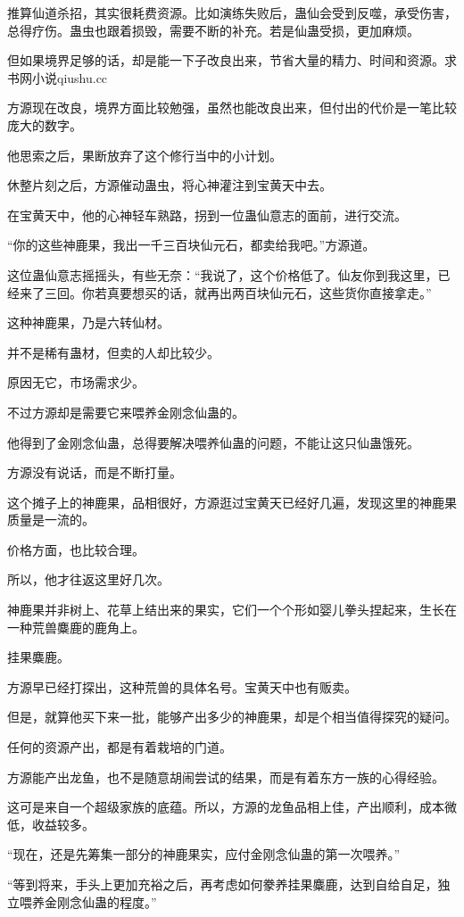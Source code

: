 \begin{this_body}
推算仙道杀招，其实很耗费资源。比如演练失败后，蛊仙会受到反噬，承受伤害，总得疗伤。蛊虫也跟着损毁，需要不断的补充。若是仙蛊受损，更加麻烦。

但如果境界足够的话，却是能一下子改良出来，节省大量的精力、时间和资源。求书网小说qiushu.cc

方源现在改良，境界方面比较勉强，虽然也能改良出来，但付出的代价是一笔比较庞大的数字。

他思索之后，果断放弃了这个修行当中的小计划。

休整片刻之后，方源催动蛊虫，将心神灌注到宝黄天中去。

在宝黄天中，他的心神轻车熟路，拐到一位蛊仙意志的面前，进行交流。

“你的这些神鹿果，我出一千三百块仙元石，都卖给我吧。”方源道。

这位蛊仙意志摇摇头，有些无奈：“我说了，这个价格低了。仙友你到我这里，已经来了三回。你若真要想买的话，就再出两百块仙元石，这些货你直接拿走。”

这种神鹿果，乃是六转仙材。

并不是稀有蛊材，但卖的人却比较少。

原因无它，市场需求少。

不过方源却是需要它来喂养金刚念仙蛊的。

他得到了金刚念仙蛊，总得要解决喂养仙蛊的问题，不能让这只仙蛊饿死。

方源没有说话，而是不断打量。

这个摊子上的神鹿果，品相很好，方源逛过宝黄天已经好几遍，发现这里的神鹿果质量是一流的。

价格方面，也比较合理。

所以，他才往返这里好几次。

神鹿果并非树上、花草上结出来的果实，它们一个个形如婴儿拳头捏起来，生长在一种荒兽麋鹿的鹿角上。

挂果麋鹿。

方源早已经打探出，这种荒兽的具体名号。宝黄天中也有贩卖。

但是，就算他买下来一批，能够产出多少的神鹿果，却是个相当值得探究的疑问。

任何的资源产出，都是有着栽培的门道。

方源能产出龙鱼，也不是随意胡闹尝试的结果，而是有着东方一族的心得经验。

这可是来自一个超级家族的底蕴。所以，方源的龙鱼品相上佳，产出顺利，成本微低，收益较多。

“现在，还是先筹集一部分的神鹿果实，应付金刚念仙蛊的第一次喂养。”

“等到将来，手头上更加充裕之后，再考虑如何豢养挂果麋鹿，达到自给自足，独立喂养金刚念仙蛊的程度。”


\end{this_body}
